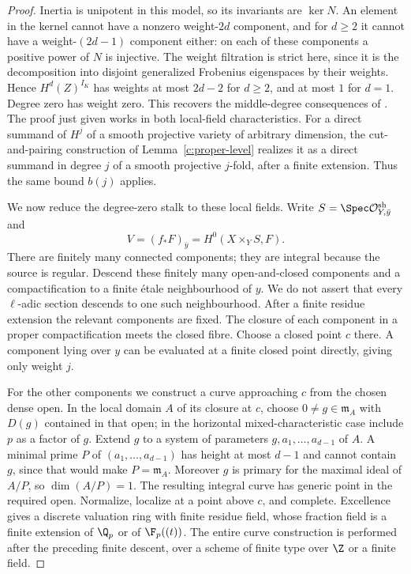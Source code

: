 \begin{proof}
Inertia is unipotent in this model, so its invariants are $\ker N$.
An element in the kernel cannot have a nonzero weight-$2d$ component,
and for $d\geq2$ it cannot have a weight-$(2d-1)$ component either:
on each of these components a positive power of $N$ is injective.
The weight filtration is strict here, since it is the decomposition
into disjoint generalized Frobenius eigenspaces by their weights.
Hence $H^d(Z)^{I_K}$ has weights at most $2d-2$ for $d\geq2$, and
at most $1$ for $d=1$.  Degree zero has weight zero.  This recovers
the middle-degree consequences of
\citet[Theorem~1.6 and Proposition~1.8, pp.~9--11]{c_yamamura2026weights}.
The proof just given works in both local-field characteristics.
For a direct summand of $H^j$ of a smooth projective variety of
arbitrary dimension, the cut-and-pairing construction of
Lemma~\ref{c:proper-level} realizes it as a direct summand in degree
$j$ of a smooth projective $j$-fold, after a finite extension.
Thus the same bound $b(j)$ applies.

We now reduce the degree-zero stalk to these local fields.
Write $S=\Spec\mathcal O_{Y,\bar y}^{\mathrm{sh}}$ and
\[
 V=(f_*F)_{\bar y}=H^0(X\times_Y S,F).
\]
There are finitely many connected components; they are integral
because the source is regular.  Descend these finitely many
open-and-closed components and a compactification to a finite
\'etale neighbourhood of $y$.  We do not assert that every
$\ell$-adic section descends to one such neighbourhood.
After a finite residue extension the relevant components are fixed.
The closure of each component in a proper compactification meets
the closed fibre.  Choose a closed point $c$ there.  A component
lying over $y$ can be evaluated at a finite closed point directly,
giving only weight $j$.

For the other components we construct a curve approaching $c$ from
the chosen dense open.  In the local domain $A$ of its closure at
$c$, choose $0\ne g\in\mathfrak m_A$ with $D(g)$ contained in
that open; in the horizontal mixed-characteristic case include $p$
as a factor of $g$.  Extend $g$ to a system of parameters
$g,a_1,\ldots,a_{d-1}$ of $A$.  A minimal prime $P$ of
$(a_1,\ldots,a_{d-1})$ has height at most $d-1$ and cannot
contain $g$, since that would make $P=\mathfrak m_A$.
Moreover $g$ is primary for the maximal ideal of $A/P$, so
$\dim(A/P)=1$.  The resulting integral curve has generic point
in the required open.  Normalize, localize at a point above $c$,
and complete.  Excellence gives a discrete valuation ring with
finite residue field, whose fraction field is a finite extension
of $\Q_p$ or of $\F_p((t))$.  The entire curve construction is
performed after the preceding finite descent, over a scheme of
finite type over $\Z$ or a finite field.


\end{proof}
